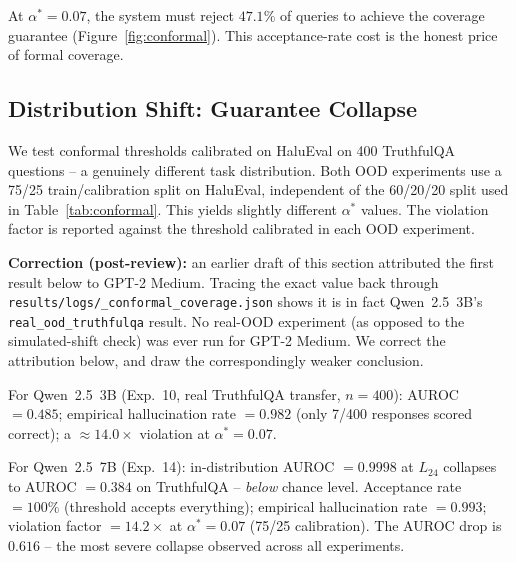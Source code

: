 \documentclass[onecolumn]{jmlr}
\begin{document}
At $\alpha^* = 0.07$, the system must reject $47.1\%$ of queries to
achieve the coverage guarantee (Figure~\ref{fig:conformal}).  This
acceptance-rate cost is the honest price of formal coverage.

\subsection{Distribution Shift: Guarantee Collapse}
\label{sec:conformal-ood}

We test conformal thresholds calibrated on HaluEval on 400 TruthfulQA
questions -- a genuinely different task distribution. Both OOD
experiments use a 75/25 train/calibration split on HaluEval, independent
of the 60/20/20 split used in Table~\ref{tab:conformal}. This yields
slightly different $\alpha^*$ values. The violation factor is reported
against the threshold calibrated in each OOD experiment.

\textbf{Correction (post-review):} an earlier draft of this section
attributed the first result below to GPT-2 Medium. Tracing the exact
value back through \texttt{results/\allowbreak logs/\_\allowbreak conformal\_\allowbreak coverage.json}
shows it is in fact Qwen~2.5~3B's \texttt{real\_\allowbreak ood\_\allowbreak truthfulqa} result.
No real-OOD experiment (as opposed to the simulated-shift check) was
ever run for GPT-2 Medium. We correct the attribution below, and draw
the correspondingly weaker conclusion.

For Qwen~2.5~3B (Exp.~10, real TruthfulQA transfer, $n=400$): AUROC
$= 0.485$; empirical hallucination rate $= 0.982$ (only 7/400 responses
scored correct); a ${\approx}14.0\times$ violation at $\alpha^* = 0.07$.

For Qwen~2.5~7B (Exp.~14): in-distribution AUROC $= 0.9998$ at $L_{24}$
collapses to AUROC $= 0.384$ on TruthfulQA -- \emph{below} chance level.
Acceptance rate $= 100\%$ (threshold accepts everything); empirical
hallucination rate $= 0.993$; violation factor $= 14.2\times$ at
$\alpha^* = 0.07$ (75/25 calibration). The AUROC drop is $0.616$ -- the
most severe collapse observed across all experiments.
\end{document}
